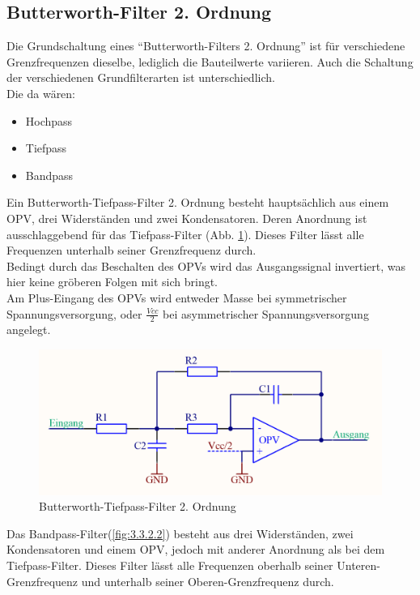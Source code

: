 \subsection{Butterworth-Filter 2. Ordnung}\label{subsec:3.3.1}
Die Grundschaltung eines \enquote{Butterworth-Filters 2. Ordnung} ist für verschiedene Grenzfrequenzen dieselbe, lediglich die Bauteilwerte variieren. Auch die Schaltung der verschiedenen Grundfilterarten ist unterschiedlich. \\
Die da wären: 
\begin{itemize}
	\item Hochpass
	\item Tiefpass
	\item Bandpass
\end{itemize}
Ein Butterworth-Tiefpass-Filter 2. Ordnung besteht hauptsächlich aus einem OPV, drei Widerständen und zwei Kondensatoren. Deren Anordnung ist ausschlaggebend für das Tiefpass-Filter (Abb. \ref{fig:3.3.2.1}). Dieses Filter lässt alle Frequenzen unterhalb seiner Grenzfrequenz durch.\\ 
Bedingt durch das Beschalten des OPVs wird das Ausgangssignal invertiert, was hier keine gröberen Folgen mit sich bringt.\\ 
Am Plus-Eingang des OPVs wird entweder Masse bei symmetrischer Spannungsversorgung, oder $\frac{Vcc}{2}$ bei asymmetrischer Spannungsversorgung angelegt.
\begin{figure} [H]
	\centering
	\includegraphics[width=1\textwidth]{img/Print3/TPFilterButterworth2Ordnung.PNG}
	\caption{Butterworth-Tiefpass-Filter 2. Ordnung}
	\label {fig:3.3.2.1}
\end{figure}
Das Bandpass-Filter(\ref{fig:3.3.2.2}) besteht aus drei Widerständen, zwei Kondensatoren und einem OPV, jedoch mit anderer Anordnung als bei dem Tiefpass-Filter.  Dieses Filter lässt alle Frequenzen oberhalb seiner Unteren-Grenzfrequenz und unterhalb seiner Oberen-Grenzfrequenz durch.
